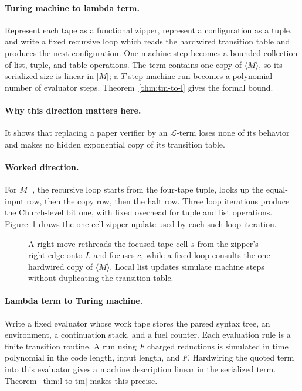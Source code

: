 \paragraph{Turing machine to lambda term.}
Represent each tape as a functional zipper, represent a configuration as a
tuple, and write a fixed recursive loop which reads the hardwired transition
table and produces the next configuration.  One machine step becomes a
bounded collection of list, tuple, and table operations.  The term contains
one copy of \(\langle M\rangle\), so its serialized size is linear in
\(|M|\); a \(T\)-step machine run becomes a polynomial number of evaluator
steps.  Theorem~\ref{thm:tm-to-l} gives the formal bound.

\paragraph{Why this direction matters here.}
It shows that replacing a paper verifier by an \(\mathcal L\)-term loses none
of its behavior and makes no hidden exponential copy of its transition table.

\paragraph{Worked direction.}
For \(M_=\), the recursive loop starts from the four-tape tuple, looks up the
equal-input row, then the copy row, then the halt row.  Three loop iterations
produce the Church-level bit one, with fixed overhead for tuple and list
operations.
Figure~\ref{fig:tm-to-lambda-zipper} draws the one-cell zipper update used by
each such loop iteration.

\begin{figure}[t]
\centering

\caption{A right move rethreads the focused tape cell $s$ from the zipper's right edge onto $L$ and focuses $c$, while a fixed loop consults the one hardwired copy of $\langle M\rangle$.  Local list updates simulate machine steps without duplicating the transition table.}
\label{fig:tm-to-lambda-zipper}
\end{figure}

\paragraph{Lambda term to Turing machine.}
Write a fixed evaluator whose work tape stores the parsed syntax tree, an
environment, a continuation stack, and a fuel counter.  Each evaluation rule
is a finite transition routine.  A run using \(F\) charged reductions is
simulated in time polynomial in the code length, input length, and \(F\).
Hardwiring the quoted term into this evaluator gives a machine description
linear in the serialized term.  Theorem~\ref{thm:l-to-tm} makes this precise.

